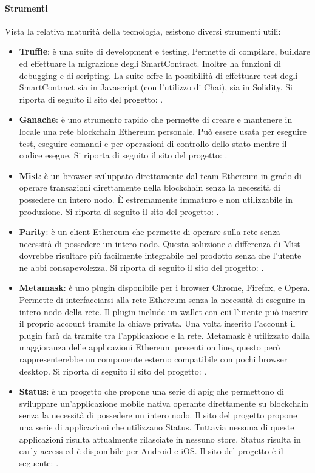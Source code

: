 \paragraph{Strumenti}
Vista la relativa maturità della tecnologia, esistono diversi strumenti utili:
\begin{itemize}
    \item \textbf{Truffle}: è una suite di development e testing. Permette di compilare, buildare ed effettuare la migrazione degli SmartContract. Inoltre ha funzioni di debugging e di scripting. La suite offre la possibilità di effettuare test degli SmartContract sia in Javascript (con l’utilizzo di Chai), sia in Solidity. Si riporta di seguito il sito del progetto: \cite{site:truffle}.
    \item \textbf{Ganache}: è uno strumento rapido che permette di creare e mantenere in locale una rete blockchain Ethereum personale. Può essere usata per eseguire test, eseguire comandi e per operazioni di controllo dello stato mentre il codice esegue. Si riporta di seguito il sito del progetto: \cite{site:ganache}.
    \item \textbf{Mist}: è un browser sviluppato direttamente dal team Ethereum in grado di operare transazioni direttamente nella blockchain senza la necessità di possedere un intero nodo. È estremamente immaturo e non utilizzabile in produzione. Si riporta di seguito il sito del progetto: \cite{site:mist}.
    \item \textbf{Parity}: è un client Ethereum che permette di operare sulla rete senza necessità di possedere un intero nodo. Questa soluzione a differenza di Mist dovrebbe risultare più facilmente integrabile nel prodotto senza che l’utente ne abbi consapevolezza. Si riporta di seguito il sito del progetto: \cite{site:parity} .
    \item \textbf{Metamask}: è uno plugin disponibile per i browser Chrome, Firefox, e Opera. Permette di interfacciarsi alla rete Ethereum senza la necessità di eseguire in intero nodo della rete. Il plugin include un wallet con cui l’utente può inserire il proprio account tramite la chiave privata. Una volta inserito l’account il plugin farà da tramite tra l’applicazione e la rete.
    Metamask è utilizzato dalla maggioranza delle applicazioni Ethereum presenti on line, questo però rappresenterebbe un componente esterno compatibile con pochi browser desktop. Si riporta di seguito il sito del progetto: \cite{site:metamask} .
    \item \textbf{Status}: è un progetto che propone una serie di \gls{apig} che permettono di sviluppare un’applicazione mobile nativa operante direttamente su blockchain senza la necessità di possedere un intero nodo. Il sito del progetto propone una serie di applicazioni che utilizzano Status. Tuttavia nessuna di queste applicazioni risulta attualmente rilasciate in nessuno store. Status risulta in early access ed è disponibile per Android e iOS. Il sito del progetto è il seguente: \cite{site:status}.

\end{itemize}

